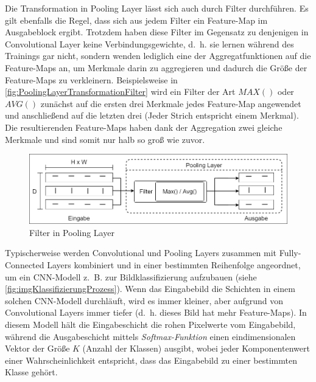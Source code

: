Die Transformation in Pooling Layer lässt sich auch durch Filter durchführen. Es gilt ebenfalls die Regel, dass sich aus jedem Filter ein Feature-Map im Ausgabeblock ergibt. Trotzdem haben diese Filter im Gegensatz zu denjenigen in Convolutional Layer keine Verbindungsgewichte, d.~h. sie lernen während des Trainings gar nicht, sondern wenden lediglich eine der Aggregatfunktionen auf die Feature-Maps an, um Merkmale darin zu aggregieren und dadurch die Größe der Feature-Maps zu verkleinern. Beispielsweise in \autoref{fig:PoolingLayerTransformationFilter} wird ein Filter der Art $MAX()$ oder $AVG()$ zunächst auf die ersten drei Merkmale jedes Feature-Map angewendet und anschließend auf die letzten drei (Jeder Strich entspricht einem Merkmal). Die resultierenden Feature-Maps haben dank der Aggregation zwei gleiche Merkmale und sind somit nur halb so groß wie zuvor.

\begin{figure}[!hb]
	\centering
	\includegraphics[width=\linewidth]{images/PoolingLayerTransformationFilter}
	\caption{Filter in Pooling Layer}
	\label{fig:PoolingLayerTransformationFilter}
\end{figure}

Typischerweise werden Convolutional und Pooling Layers zusammen mit Fully-Connected Layers kombiniert und in einer bestimmten Reihenfolge angeordnet, um ein CNN-Modell z.~B. zur Bildklassifizierung aufzubauen (siehe \autoref{fig:imgKlassifizierungProzess}). Wenn das Eingabebild die Schichten in einem solchen CNN-Modell durchläuft, wird es immer kleiner, aber aufgrund von Convolutional Layers immer tiefer (d.~h. dieses Bild hat mehr Feature-Maps). In diesem Modell hält die Eingabeschicht die rohen Pixelwerte vom Eingabebild, während die Ausgabeschicht mittels \emph{Softmax-Funktion} einen eindimensionalen Vektor der Größe $K$ (Anzahl der Klassen) ausgibt, wobei jeder Komponentenwert einer Wahrscheinlichkeit entspricht, dass das Eingabebild zu einer bestimmten Klasse gehört. 

